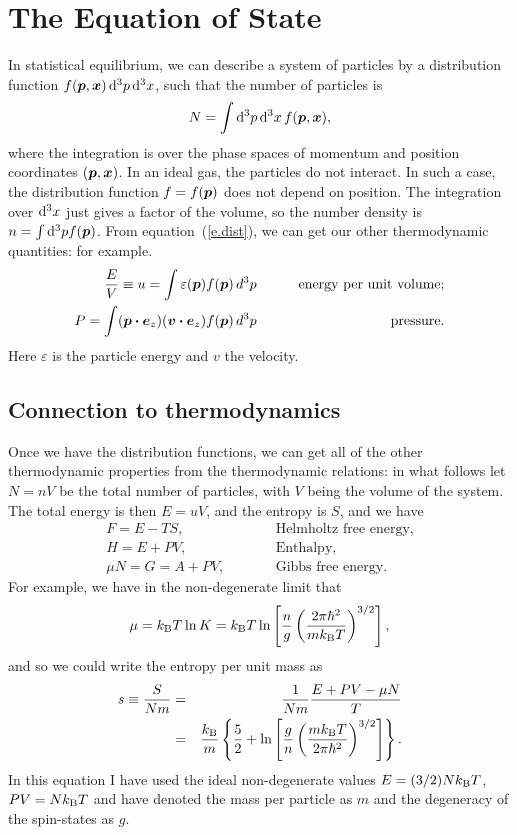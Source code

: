 \chapter[Equation of State]{The Equation of State}\label{ch.equation-of-state}

In statistical equilibrium, we can describe a system of particles by a distribution function $f(\boldsymbol{p},\boldsymbol{x})\,\mathrm{d}^{3}p\,\mathrm{d}^{3}x$, such that the number of particles is
\begin{equation}\label{e.dist}
N = \int \mathrm{d}^{3}p\,\mathrm{d}^{3}x\, f(\boldsymbol{p},\boldsymbol{x}),
\end{equation}
where the integration is over the phase spaces of momentum and position coordinates $(\boldsymbol{p},\boldsymbol{x})$. In an ideal gas, the particles do not interact. In such a case, the distribution function $f = f(\boldsymbol{p})$ does not depend on position.  The integration over $\mathrm{d}^{3}x$ just gives a factor of the volume, so the number density is $n = \int\mathrm{d}^{3}p f(\boldsymbol{p})$.  From equation~(\ref{e.dist}), we can get our other thermodynamic quantities: for example.
\begin{eqnarray}
\frac{E}{V} \equiv u = \int  \varepsilon(\boldsymbol{p}) f(\boldsymbol{p})\,d^{3}p &\qquad& \textrm{energy per unit volume;}\label{e.u}\\
P = \int  (\boldsymbol{p}\boldsymbol{\cdot} \boldsymbol{e}_{z} )(\boldsymbol{v}\boldsymbol{\cdot}\boldsymbol{e}_{z}) f(\boldsymbol{p})\,d^{3}p &\qquad& \textrm{pressure}.\label{e.P}
\end{eqnarray}
Here $\varepsilon$ is the particle energy and $v$ the velocity.

\section{Connection to thermodynamics}
Once we have the distribution functions, we can get all of the other thermodynamic properties from the thermodynamic relations: in what follows let $N = nV$ be the total number of particles, with $V$ being the volume of the system.  The total energy is then $E = uV$, and the entropy is $S$, and we have
\begin{eqnarray}
F = E - TS, &\qquad& \textrm{Helmholtz free energy,}\\
H = E + PV, &\qquad& \textrm{Enthalpy,}\\
\mu N = G = A + PV, &\qquad& \textrm{Gibbs free energy}.
\end{eqnarray}
For example, we have in the non-degenerate limit that
\begin{equation}\label{e.chem-pot-ideal-gas}
\mu = k_\mathrm{B} T\ln K = k_\mathrm{B} T\ln\left[ \frac{n}{g}\left(\frac{2\pi\hbar^{2}}{mk_\mathrm{B} T}\right)^{3/2}\right],
\end{equation}
and so we could write the entropy per unit mass as
\begin{eqnarray}
s \equiv \frac{S}{Nm} &=& \frac{1}{Nm}\frac{E + PV - \mu N}{T}\nonumber\\
 &=& \frac{k_\mathrm{B} }{m}\left\{ \frac{5}{2} + \ln\left[\frac{g}{n}\left(\frac{mk_\mathrm{B} T}{2\pi\hbar^{2}}\right)^{3/2}\right]\right\}.
\label{e.sacker-tetrode}
 \end{eqnarray}
In this equation I have used the ideal non-degenerate values $E = (3/2) Nk_\mathrm{B} T$, $PV = Nk_\mathrm{B} T$ and have denoted the mass per particle as $m$ and the degeneracy of the spin-states as $g$.

